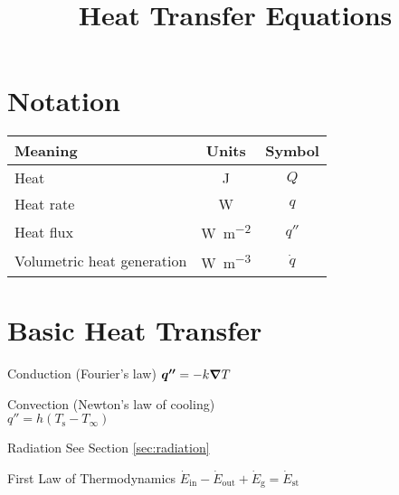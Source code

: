 \documentclass{article}
\title{Heat Transfer Equations}
\begin{document}


\begin{multicols}{2}
\setlength{\columnseprule}{0.5pt}

\section{Notation}
\begin{tabu}{lcc}
  \toprule
  Meaning & Units & Symbol \\
  \midrule
  Heat & \si{\joule} & $Q$ \\
  Heat rate & \si{\watt} & $q$ \\
  Heat flux & \si{\watt\per\square\meter} & $q''$ \\
  Volumetric heat generation & \si{\watt\per\cubic\meter} & $\dot q$ \\
  \bottomrule
\end{tabu}

\section{Basic Heat Transfer}

\begin{description*}
\item[Conduction (Fourier's law)]
  \(\bm{q''} = -k \bm{\nabla} T\)
\item[Convection (Newton's law of cooling)]~\\
  \(q'' = h(T_\mathrm{s}-T_\infty)\)
\item[Radiation] See Section \ref{sec:radiation}
\item[First Law of Thermodynamics]
  \(\dot{E}_\mathrm{in}-\dot{E}_\mathrm{out}+\dot{E}_\mathrm{g} = \dot{E}_\mathrm{st}\)
\end{description*}


\end{multicols}
\end{document}
